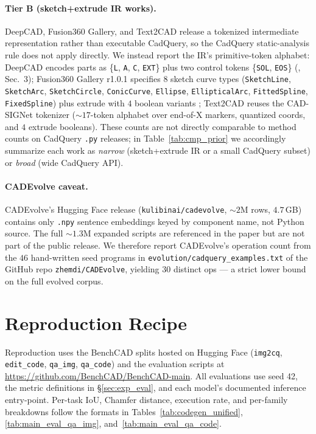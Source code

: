 \paragraph{Tier B (sketch+extrude IR works).}
DeepCAD, Fusion360 Gallery, and Text2CAD release a tokenized intermediate representation rather than executable CadQuery, so the CadQuery static-analysis rule does not apply directly. We instead report the IR's primitive-token alphabet: DeepCAD encodes parts as \{\texttt{L}, \texttt{A}, \texttt{C}, \texttt{EXT}\} plus two control tokens \{\texttt{SOL}, \texttt{EOS}\} (\citet{Wu2021}, Sec.~3); Fusion360 Gallery r1.0.1 specifies $8$ sketch curve types (\texttt{SketchLine}, \texttt{SketchArc}, \texttt{SketchCircle}, \texttt{ConicCurve}, \texttt{Ellipse}, \texttt{EllipticalArc}, \texttt{FittedSpline}, \texttt{FixedSpline}) plus extrude with $4$ boolean variants \citep{Willis2021fusion}; Text2CAD reuses the CAD-SIGNet tokenizer ($\sim$$17$-token alphabet over end-of-X markers, quantized coords, and $4$ extrude booleans). These counts are not directly comparable to method counts on CadQuery \texttt{.py} releases; in Table~\ref{tab:cmp_prior} we accordingly summarize each work as \emph{narrow} (sketch+extrude IR or a small CadQuery subset) or \emph{broad} (wide CadQuery API).

\paragraph{CADEvolve caveat.}
CADEvolve's Hugging Face release (\texttt{kulibinai/cadevolve}, $\sim$$2$M rows, $4.7$\,GB) contains only \texttt{.npy} sentence embeddings keyed by component name, not Python source. The full $\sim$$1.3$M expanded scripts are referenced in the paper but are not part of the public release. We therefore report CADEvolve's operation count from the $46$ hand-written seed programs in \texttt{evolution/cadquery\_examples.txt} of the GitHub repo \texttt{zhemdi/CADEvolve}, yielding $30$ distinct ops --- a strict lower bound on the full evolved corpus.


\section{Reproduction Recipe}
\label{app:reproduce}

Reproduction uses the BenchCAD splits hosted on Hugging Face (\texttt{img2cq}, \texttt{edit\_code}, \texttt{qa\_img}, \texttt{qa\_code}) and the evaluation scripts at \url{https://github.com/BenchCAD/BenchCAD-main}. All evaluations use seed 42, the metric definitions in \S\ref{sec:exp_eval}, and each model's documented inference entry-point. Per-task IoU, Chamfer distance, execution rate, and per-family breakdowns follow the formats in Tables~\ref{tab:codegen_unified}, \ref{tab:main_eval_qa_img}, and~\ref{tab:main_eval_qa_code}.

